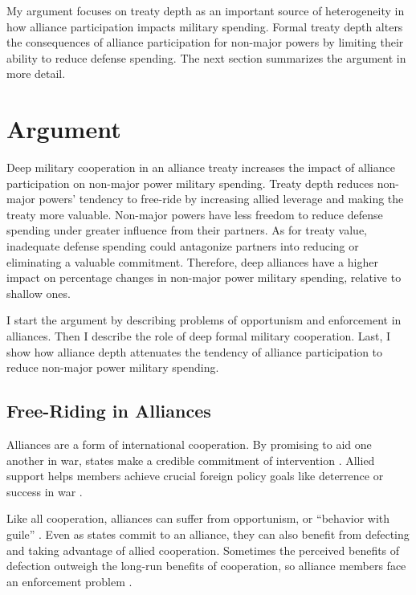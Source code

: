\documentclass[12pt]{article}
\begin{document}
My argument focuses on treaty depth as an important source of heterogeneity in how alliance participation impacts military spending. 
Formal treaty depth alters the consequences of alliance participation for non-major powers by limiting their ability to reduce defense spending. 
The next section summarizes the argument in more detail. 



\section{Argument}

Deep military cooperation in an alliance treaty increases the impact of alliance participation on non-major power military spending.
Treaty depth reduces non-major powers' tendency to free-ride by increasing allied leverage and making the treaty more valuable. 
Non-major powers have less freedom to reduce defense spending under greater influence from their partners. 
As for treaty value, inadequate defense spending could antagonize partners into reducing or eliminating a valuable commitment. 
Therefore, deep alliances have a higher impact on percentage changes in non-major power military spending, relative to shallow ones. 


I start the argument by describing problems of opportunism and enforcement in alliances. 
Then I describe the role of deep formal military cooperation. 
Last, I show how alliance depth attenuates the tendency of alliance participation to reduce non-major power military spending. 


\subsection{Free-Riding in Alliances}

Alliances are a form of international cooperation. 
By promising to aid one another in war, states make a credible commitment of intervention \citep{Fearon1997, Morrow2000}. 
Allied support helps members achieve crucial foreign policy goals like deterrence or success in war \citep{Walt1990, Snyder1997}. 


Like all cooperation, alliances can suffer from opportunism, or ``behavior with guile'' \citep{Williamson1985}. 
Even as states commit to an alliance, they can also benefit from defecting and taking advantage of allied cooperation. 
Sometimes the perceived benefits of defection outweigh the long-run benefits of cooperation, so alliance members face an enforcement problem \citep{Fearon1998a, Koremenosetal2001}.
\end{document}
